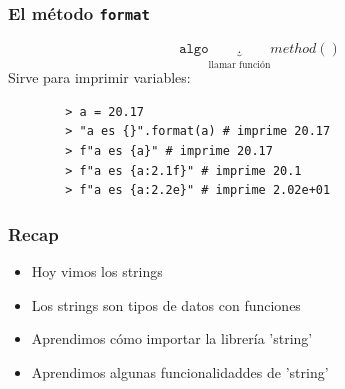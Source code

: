 \documentclass[14pt,aspectratio=169,xcolor=dvipsnames]{beamer}
\begin{document}
\begin{frame}\frametitle{El método \texttt{format}}
    $$  \texttt{algo}\underbrace{.}_\text{llamar función}method() $$
Sirve para imprimir variables:
    \begin{verbatim}
        > a = 20.17
        > "a es {}".format(a) # imprime 20.17
        > f"a es {a}" # imprime 20.17
        > f"a es {a:2.1f}" # imprime 20.1
        > f"a es {a:2.2e}" # imprime 2.02e+01
    \end{verbatim}
\end{frame}
\begin{frame}\frametitle{Recap}
    \begin{itemize}
        \item Hoy vimos los strings
        \item Los strings son tipos de datos con funciones
        \item Aprendimos cómo importar la librería 'string'
        \item Aprendimos algunas funcionalidaddes de 'string'
    \end{itemize}
\end{frame}
\begin{frame}
    \maketitle
\end{frame}
\end{document}
